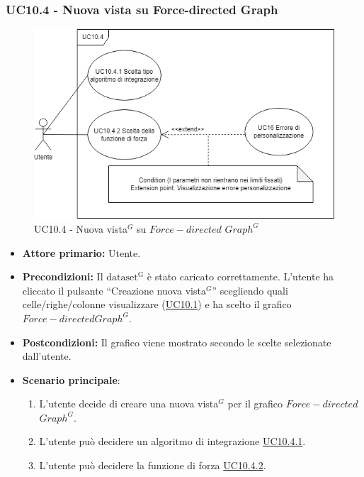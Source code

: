 \subsubsection{UC10.4 - Nuova vista su Force-directed Graph}
\label{sec:UC10.4}
\begin{figure}[h!]
	\centering
	\includegraphics[scale=0.60]{../../assets/nuova_vista_force.png}
	\caption{UC10.4 - Nuova vista$^{G}$ su $Force-directed$ $Graph^{G}$}
\end{figure}
\begin{itemize}
    \item \textbf{Attore primario:} Utente.
    \item \textbf{Precondizioni:} Il ${\mathrm{dataset^{G}}}$ è stato caricato correttamente. L'utente ha cliccato il pulsante ``Creazione nuova vista$^{G}$'' scegliendo quali celle/righe/colonne visualizzare (\hyperref[sec:UC10.1]{UC10.1}) e ha scelto il grafico $Force-directed Graph^{G}$.
    \item \textbf{Postcondizioni:} Il grafico viene mostrato secondo le scelte selezionate dall'utente.
    \item \textbf{Scenario principale}:
    \begin{enumerate}
		\item L'utente decide di creare una nuova vista$^{G}$ per il grafico $Force-directed$ $Graph^{G}$.
		\item L'utente può decidere un algoritmo di integrazione \hyperref[sec:UC10.4.1]{UC10.4.1}.
		\item L'utente può decidere la funzione di forza \hyperref[sec:UC10.4.2]{UC10.4.2}.
	\end{enumerate}
\end{itemize}


